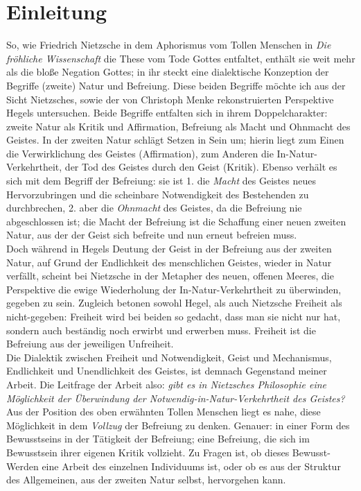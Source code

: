 \documentclass[12pt, a4paper, openany]{report}
\newcommand\mainmatter{ \cleardoublepage \pagenumbering{arabic}}
\begin{document}
\tableofcontents

\mainmatter

\chapter{Einleitung}
So, wie Friedrich Nietzsche in dem Aphorismus vom \glqq Tollen Menschen\grqq{} in \textit{Die fröhliche Wissenschaft} die These vom Tode Gottes entfaltet, enthält sie weit mehr als die bloße Negation Gottes;
in ihr steckt eine dialektische Konzeption der Begriffe (zweite) Natur und Befreiung.
Diese beiden Begriffe möchte ich aus der Sicht Nietzsches, sowie der von Christoph Menke rekonstruierten Perspektive Hegels untersuchen.
Beide Begriffe entfalten sich in ihrem Doppelcharakter: zweite Natur als Kritik und Affirmation, Befreiung als Macht und Ohnmacht des Geistes.
In der zweiten Natur schlägt Setzen in Sein um; hierin liegt zum Einen die Verwirklichung des Geistes (Affirmation), zum Anderen die In-Natur-Verkehrtheit, der Tod des Geistes durch den Geist (Kritik).
Ebenso verhält es sich mit dem Begriff der Befreiung: 
sie ist 1. die \textit{Macht} des Geistes neues Hervorzubringen und die scheinbare Notwendigkeit des Bestehenden zu durchbrechen, 
2. aber die \textit{Ohnmacht} des Geistes, da die Befreiung nie abgeschlossen ist; die Macht der Befreiung ist die Schaffung einer \glqq neuen\grqq{} zweiten Natur, aus der der Geist sich befreite und nun erneut befreien muss.\\
Doch während in Hegels Deutung der Geist in der Befreiung aus der zweiten Natur, auf Grund der Endlichkeit des menschlichen Geistes, wieder in Natur verfällt, scheint bei Nietzsche in der Metapher des neuen, offenen Meeres, die Perspektive die ewige Wiederholung der In-Natur-Verkehrtheit zu überwinden, gegeben zu sein.
Zugleich betonen sowohl Hegel, als auch Nietzsche Freiheit als nicht-gegeben: 
Freiheit wird bei beiden so gedacht, dass man sie \glqq nicht nur hat, sondern auch beständig  noch erwirbt und erwerben muss\grqq{}. 
Freiheit ist die Befreiung aus der jeweiligen Unfreiheit. \\
Die Dialektik zwischen Freiheit und Notwendigkeit, Geist und Mechanismus, Endlichkeit und Unendlichkeit des Geistes, ist demnach Gegenstand meiner Arbeit. 
Die Leitfrage der Arbeit also: \textit{gibt es in Nietzsches Philosophie eine Möglichkeit der Überwindung der Notwendig-in-Natur-Verkehrtheit des Geistes?}\\
Aus der Position des oben erwähnten \glqq Tollen Menschen\grqq{} liegt es nahe, diese Möglichkeit in dem \textit{Vollzug} der Befreiung zu denken. 
Genauer: in einer Form des Bewusstseins in der Tätigkeit der Befreiung; 
eine Befreiung, die sich im Bewusstsein ihrer eigenen Kritik vollzieht.
Zu Fragen ist, ob dieses Bewusst-Werden eine Arbeit des einzelnen Individuums ist, oder ob es aus der Struktur des Allgemeinen, aus der zweiten Natur selbst, hervorgehen kann.\\
\end{document}

